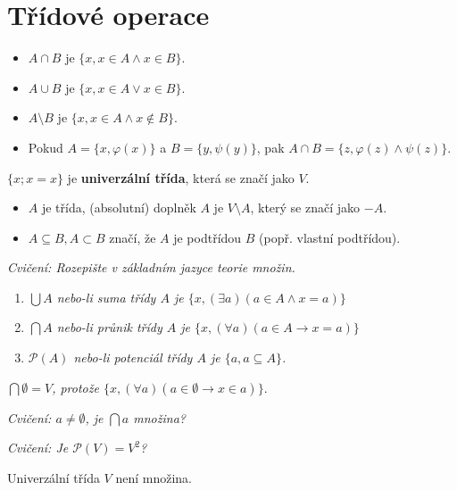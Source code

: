 \section{Třídové operace}

\begin{definice}
	\begin{itemize}
		\item $A \cap B$ je $\{x, x \in A \land x \in B\}$.
		\item $A \cup B$ je $\{x, x \in A \lor x \in B\}$.
		\item $A \setminus B$ je $\{x, x \in A \land x \notin B\}$.
		\item Pokud $A = \{x, \varphi(x)\}$ a $B = \{y, \psi(y)\}$, pak $A \cap B = \{z, \varphi(z) \land \psi(z)\}$.
	\end{itemize}
\end{definice}

\begin{definice}
	$\{x; x = x\}$ je \textbf{univerzální třída}, která se značí jako $V$.
\end{definice}

\begin{itemize}
	\item $A$ je třída, (absolutní) doplněk $A$ je $V \setminus A$, který se značí jako $-A$.
	\item $A \subseteq B, A \subset B$ značí, že $A$ je podtřídou $B$ (popř. vlastní podtřídou).
\end{itemize}

\textit{Cvičení: Rozepište v základním jazyce teorie množin.}

\begin{enumerate}
	\item \textit{$\bigcup A$ nebo-li suma třídy $A$ je $\{x, (\exists a)(a \in A \land x = a)\}$}
	\item \textit{$\bigcap A$ nebo-li průnik třídy $A$ je $\{x, (\forall a)(a \in A \rightarrow x = a)\}$}
	\item \textit{$\mathcal{P}(A)$ nebo-li potenciál třídy $A$ je $\{a, a \subseteq A\}$.}
\end{enumerate}

\textit{$\bigcap \emptyset = V$, protože $\{x, (\forall a)(a \in \emptyset \rightarrow x \in a)\}.$}

\textit{Cvičení: $a \neq \emptyset$, je $\bigcap a$ množina?}

\textit{Cvičení: Je $\mathcal{P}(V) = V^{2}$?}

\begin{lemma}
	Univerzální třída $V$ není množina.
\end{lemma}

